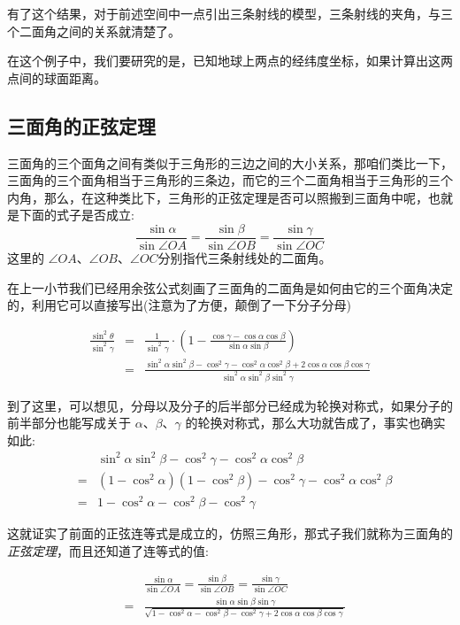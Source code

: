 有了这个结果，对于前述空间中一点引出三条射线的模型，三条射线的夹角，与三个二面角之间的关系就清楚了。

\begin{example}[根据经纬度计算地球上两点间的(球面)距离]
  在这个例子中，我们要研究的是，已知地球上两点的经纬度坐标，如果计算出这两点间的球面距离。
\end{example}

\subsection{三面角的正弦定理}
\label{sec:sine-thoream-of-trihedral-angle}

三面角的三个面角之间有类似于三角形的三边之间的大小关系，那咱们类比一下，三面角的三个面角相当于三角形的三条边，而它的三个二面角相当于三角形的三个内角，那么，在这种类比下，三角形的正弦定理是否可以照搬到三面角中呢，也就是下面的式子是否成立:
\[ \frac{\sin{\alpha}}{\sin{\angle OA}} = \frac{\sin{\beta}}{\sin{\angle OB}} = \frac{\sin{\gamma}}{\sin{\angle OC}} \]
这里的 $\angle OA$、$\angle OB$、$\angle OC$分别指代三条射线处的二面角。

在上一小节我们已经用余弦公式刻画了三面角的二面角是如何由它的三个面角决定的，利用它可以直接写出(注意为了方便，颠倒了一下分子分母)

\begin{eqnarray*}
  \frac{\sin^{2}{\theta}}{\sin^2{\gamma}} & = & \frac{1}{\sin^2{\gamma}} \cdot \left( 1-\frac{\cos{\gamma}-\cos{\alpha}\cos{\beta}}{\sin{\alpha}\sin{\beta}} \right) \\
  & = & \frac{\sin^2{\alpha}\sin^2{\beta}-\cos^2{\gamma}-\cos^2{\alpha}\cos^2{\beta}+2\cos{\alpha}\cos{\beta}\cos{\gamma}}{\sin^2{\alpha}\sin^2{\beta}\sin^2{\gamma}} 
\end{eqnarray*}

到了这里，可以想见，分母以及分子的后半部分已经成为轮换对称式，如果分子的前半部分也能写成关于 $\alpha$、$\beta$、$\gamma$ 的轮换对称式，那么大功就告成了，事实也确实如此:
\begin{eqnarray*}
  && \sin^2{\alpha}\sin^2{\beta}-\cos^2{\gamma}-\cos^2{\alpha}\cos^2{\beta} \\
  & = & (1-\cos^2{\alpha})(1-\cos^2{\beta})-\cos^2{\gamma}-\cos^2{\alpha}\cos^2{\beta} \\
   & = & 1-\cos^2{\alpha}-\cos^2{\beta}-\cos^2{\gamma}
\end{eqnarray*}

这就证实了前面的正弦连等式是成立的，仿照三角形，那式子我们就称为三面角的 \emph{正弦定理}，而且还知道了连等式的值:

\begin{eqnarray*}
  && \frac{\sin{\alpha}}{\sin{\angle OA}} = \frac{\sin{\beta}}{\sin{\angle OB}} = \frac{\sin{\gamma}}{\sin{\angle OC}} \\
  & = & \frac{\sin{\alpha}\sin{\beta}\sin{\gamma}}{\sqrt{1-\cos^2{\alpha}-\cos^2{\beta}-\cos^2{\gamma}+2\cos{\alpha}\cos{\beta}\cos{\gamma}}}
\end{eqnarray*}

